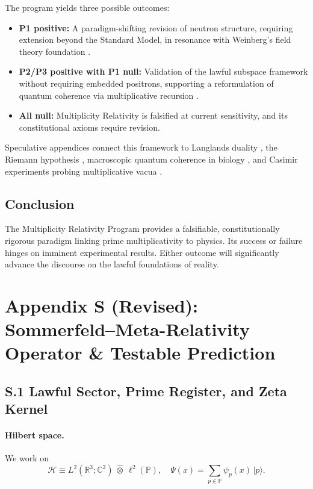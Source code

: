 \documentclass[12]{amsart}
\theoremstyle{plain}
\begin{document}
The program yields three possible outcomes:

\begin{itemize}
    \item \textbf{P1 positive:} A paradigm-shifting revision of neutron structure, requiring extension beyond the Standard Model, in resonance with Weinberg’s field theory foundation \cite{Weinberg:1995mt}.
    \item \textbf{P2/P3 positive with P1 null:} Validation of the lawful subspace framework without requiring embedded positrons, supporting a reformulation of quantum coherence via multiplicative recursion \cite{CitizenGardens:2023b}.
    \item \textbf{All null:} Multiplicity Relativity is falsified at current sensitivity, and its constitutional axioms require revision.
\end{itemize}

Speculative appendices connect this framework to Langlands duality \cite{Langlands:1967}, the Riemann hypothesis \cite{Berry1979}, macroscopic quantum coherence in biology \cite{Hameroff:2014}, and Casimir experiments probing multiplicative vacua \cite{Lamoreaux:1996wh,Mohideen1998}.

\subsection{Conclusion}

The Multiplicity Relativity Program provides a falsifiable, constitutionally rigorous paradigm linking prime multiplicativity to physics. Its success or failure hinges on imminent experimental results. Either outcome will significantly advance the discourse on the lawful foundations of reality.

\section*{Appendix S (Revised): Sommerfeld--Meta-Relativity Operator \& Testable Prediction}

\subsection*{S.1 Lawful Sector, Prime Register, and Zeta Kernel}

\paragraph{Hilbert space.}
We work on
\[
\mathcal H \equiv L^2(\mathbb R^3;\mathbb C^2)\ \widehat{\otimes}\ \ell^2(\mathbb P),
\quad
\Psi(x)=\sum_{p\in\mathbb P}\psi_p(x)\,|p\rangle.
\]
\end{document}
